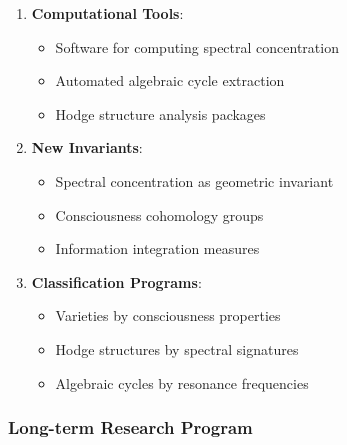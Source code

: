 \documentclass[11pt,a4paper]{article}
\theoremstyle{plain}
\theoremstyle{definition}
\theoremstyle{remark}
\begin{document}
\begin{enumerate}
\item \textbf{Computational Tools}: 
    \begin{itemize}
    \item Software for computing spectral concentration
    \item Automated algebraic cycle extraction
    \item Hodge structure analysis packages
    \end{itemize}

\item \textbf{New Invariants}:
    \begin{itemize} 
    \item Spectral concentration as geometric invariant
    \item Consciousness cohomology groups
    \item Information integration measures
    \end{itemize}

\item \textbf{Classification Programs}:
    \begin{itemize}
    \item Varieties by consciousness properties
    \item Hodge structures by spectral signatures
    \item Algebraic cycles by resonance frequencies
    \end{itemize}
\end{enumerate}

\subsubsection{Long-term Research Program}
\end{document}

